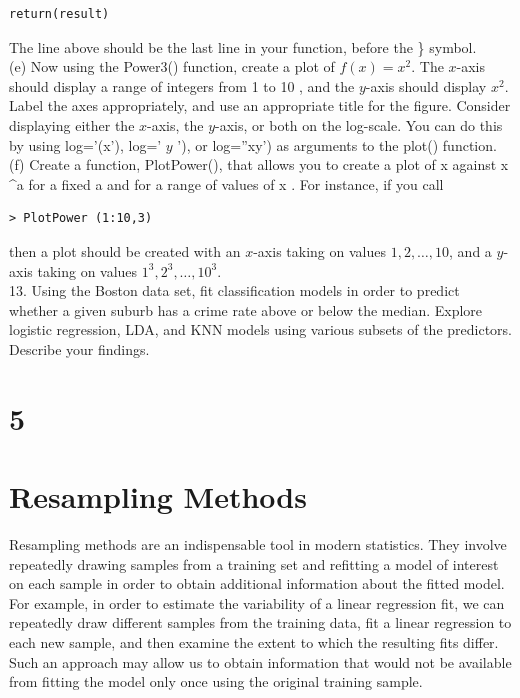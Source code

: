 \documentclass[10pt]{article}
\begin{document}
\begin{verbatim}
return(result)
\end{verbatim}

The line above should be the last line in your function, before the \} symbol.\\
(e) Now using the Power3() function, create a plot of $f(x)=x^{2}$. The $x$-axis should display a range of integers from 1 to 10 , and the $y$-axis should display $x^{2}$. Label the axes appropriately, and use an appropriate title for the figure. Consider displaying either the $x$-axis, the $y$-axis, or both on the log-scale. You can do this by using log='(x'), log=' $y$ '), or log=''xy') as arguments to the plot() function.\\
(f) Create a function, PlotPower(), that allows you to create a plot of x against x \^{}a for a fixed a and for a range of values of x . For instance, if you call

\begin{verbatim}
> PlotPower (1:10,3)
\end{verbatim}

then a plot should be created with an $x$-axis taking on values $1,2, \ldots, 10$, and a $y$-axis taking on values $1^{3}, 2^{3}, \ldots, 10^{3}$.\\
13. Using the Boston data set, fit classification models in order to predict whether a given suburb has a crime rate above or below the median. Explore logistic regression, LDA, and KNN models using various subsets of the predictors. Describe your findings.

\section*{5}
\section*{Resampling Methods}
Resampling methods are an indispensable tool in modern statistics. They involve repeatedly drawing samples from a training set and refitting a model of interest on each sample in order to obtain additional information about the fitted model. For example, in order to estimate the variability of a linear regression fit, we can repeatedly draw different samples from the training data, fit a linear regression to each new sample, and then examine the extent to which the resulting fits differ. Such an approach may allow us to obtain information that would not be available from fitting the model only once using the original training sample.
\end{document}
